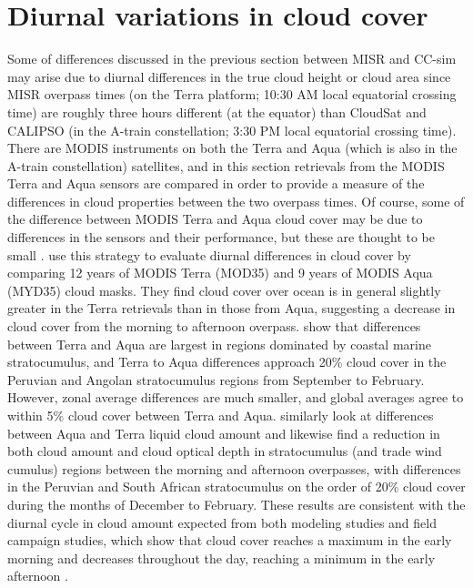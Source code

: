 \section{Diurnal variations in cloud cover} \label{misr_diurnal}
Some of differences discussed in the previous section between MISR and CC-sim may arise due to diurnal differences in the true cloud height or cloud area since MISR overpass times (on the Terra platform; 10:30 AM local equatorial crossing time) are roughly three hours different (at the equator) than CloudSat and CALIPSO (in the A-train constellation; 3:30 PM local equatorial crossing time). There are MODIS instruments on both the Terra and Aqua (which is also in the A-train constellation) satellites, and in this section retrievals from the MODIS Terra and Aqua sensors are compared in order to provide a measure of the differences in cloud properties between the two overpass times. Of course, some of the difference between MODIS Terra and Aqua cloud cover may be due to differences in the sensors and their performance, but these are thought to be small \citep{king_et_al_2013}. \cite{king_et_al_2013} use this strategy to evaluate diurnal differences in cloud cover by comparing 12 years of MODIS Terra (MOD35) and 9 years of MODIS Aqua (MYD35) cloud masks. They find cloud cover over ocean is in general slightly greater in the Terra retrievals than in those from Aqua, suggesting a decrease in cloud cover from the morning to afternoon overpass. \cite{king_et_al_2013} show that differences between Terra and Aqua are largest in regions dominated by coastal marine stratocumulus, and Terra to Aqua differences approach 20\% cloud cover in the Peruvian and Angolan stratocumulus regions from September to February. However, zonal average differences are much smaller, and global averages agree to within 5\% cloud cover between Terra and Aqua. \cite{meskhidze_et_al_2009} similarly look at differences between Aqua and Terra liquid cloud amount and likewise find a reduction in both cloud amount and cloud optical depth in stratocumulus (and trade wind cumulus) regions between the morning and afternoon overpasses, with differences in the Peruvian and South African stratocumulus on the order of 20\% cloud cover during the months of December to February. These results are consistent with the diurnal cycle in cloud amount expected from both modeling studies and field campaign studies, which show that cloud cover reaches a maximum in the early morning and decreases throughout the day, reaching a minimum in the early afternoon \citep{bretherton_et_al_2004}.

